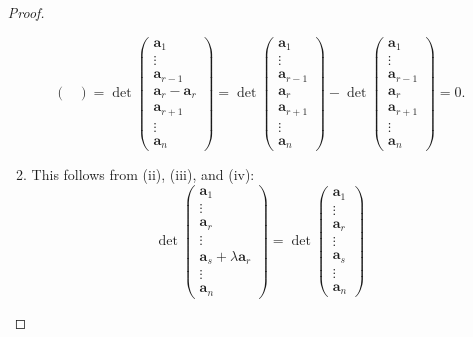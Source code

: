 \documentclass[10pt, a4paper]{article}
\newcommand{\mbf}[1]{\mathbf{#1}}
\begin{document}
\begin{enumerate}[label = (\roman*)]
\begin{proof}
\begin{enumerate}[label = (\roman*)]
\[\begin{pmatrix}
            \end{pmatrix}
            =
            \det\begin{pmatrix}
                \mbf{a}_1 \\ \vdots \\ \mbf{a}_{r - 1} \\ \mbf{a}_r - \mbf{a}_r \\ \mbf{a}_{r + 1} \\ \vdots \\ \mbf{a}_n
            \end{pmatrix}
            =
            \det\begin{pmatrix}
                \mbf{a}_1 \\ \vdots \\ \mbf{a}_{r - 1} \\ \mbf{a}_r \\ \mbf{a}_{r + 1} \\ \vdots \\ \mbf{a}_n
            \end{pmatrix}
            -
            \det\begin{pmatrix}
                \mbf{a}_1 \\ \vdots \\ \mbf{a}_{r - 1} \\ \mbf{a}_r \\ \mbf{a}_{r + 1} \\ \vdots \\ \mbf{a}_n
            \end{pmatrix}
            = 0.
            \]
            \item This follows from (ii), (iii), and (iv):
            \[
            \det\begin{pmatrix}
                \mbf{a}_1 \\ \vdots \\ \mbf{a}_r \\ \vdots \\ \mbf{a}_s + \lambda \mbf{a}_r \\ \vdots \\ \mbf{a}_n
            \end{pmatrix}
            =
            \det\begin{pmatrix}
                \mbf{a}_1 \\ \vdots \\ \mbf{a}_r \\ \vdots \\ \mbf{a}_s \\ \vdots \\ \mbf{a}_n

\end{pmatrix}\]
\end{enumerate}
\end{proof}
\end{enumerate}
\end{document}
